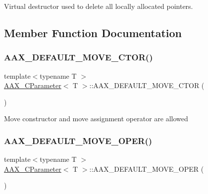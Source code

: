 Virtual destructor used to delete all locally allocated pointers. 



\subsection{Member Function Documentation}
\mbox{\label{a01537_a580ce7701ad95682e19e921219fb9dc7}} 
\subsubsection{\texorpdfstring{AAX\_DEFAULT\_MOVE\_CTOR()}{AAX\_DEFAULT\_MOVE\_CTOR()}}
{\footnotesize\ttfamily template$<$typename T $>$ \\
\mbox{\hyperlink{a01537}{A\+A\+X\+\_\+\+C\+Parameter}}$<$ T $>$\+::A\+A\+X\+\_\+\+D\+E\+F\+A\+U\+L\+T\+\_\+\+M\+O\+V\+E\+\_\+\+C\+T\+OR (\begin{DoxyParamCaption}\item[{\mbox{\hyperlink{a01537}{A\+A\+X\+\_\+\+C\+Parameter}}$<$ T $>$}]{ }\end{DoxyParamCaption})}

Move constructor and move assignment operator are allowed \mbox{\label{a01537_a8bb6096dc8908ba8ec8070bc2884f98a}} 
\subsubsection{\texorpdfstring{AAX\_DEFAULT\_MOVE\_OPER()}{AAX\_DEFAULT\_MOVE\_OPER()}}
{\footnotesize\ttfamily template$<$typename T $>$ \\
\mbox{\hyperlink{a01537}{A\+A\+X\+\_\+\+C\+Parameter}}$<$ T $>$\+::A\+A\+X\+\_\+\+D\+E\+F\+A\+U\+L\+T\+\_\+\+M\+O\+V\+E\+\_\+\+O\+P\+ER (\begin{DoxyParamCaption}\item[{\mbox{\hyperlink{a01537}{A\+A\+X\+\_\+\+C\+Parameter}}$<$ T $>$}]{ }\end{DoxyParamCaption})}

